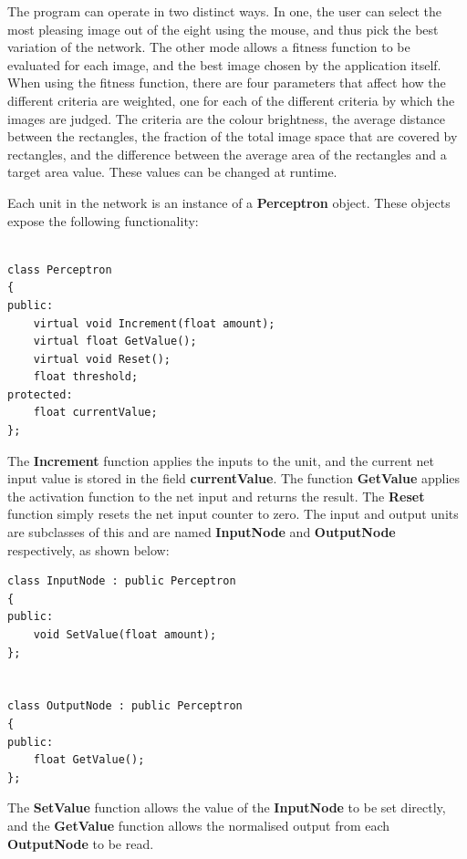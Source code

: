 \documentclass{acm_proc_article-sp}
\begin{document}
\vspace{3mm}

The program can operate in two distinct ways. In one, the user can select the most pleasing image out of the eight using the mouse, and thus pick the best variation of the network. The other mode allows a fitness function to be evaluated for each image, and the best image chosen by the application itself. When using the fitness function, there are four parameters that affect how the different criteria are weighted, one for each of the different criteria by which the images are judged. The criteria are the colour brightness, the average distance between the rectangles, the fraction of the total image space that are covered by rectangles, and the difference between the average area of the rectangles and a target area value. These values can be changed at runtime.

\vspace{3.2mm}

Each unit in the network is an instance of a \textbf{Perceptron} object. These objects expose the following functionality:

\begin{verbatim}

class Perceptron
{
public:
    virtual void Increment(float amount);
    virtual float GetValue();
    virtual void Reset();
    float threshold;
protected:
    float currentValue;	
};
\end{verbatim}

The \textbf{Increment} function applies the inputs to the unit, and the current net input value is stored in the field \textbf{currentValue}. The function \textbf{GetValue} applies the activation function to the net input and returns the result. The \textbf{Reset} function simply resets the net input counter to zero. The input and output units are subclasses of this and are named \textbf{InputNode} and \textbf{OutputNode} respectively, as shown below:

\begin{verbatim}
class InputNode : public Perceptron
{
public:
    void SetValue(float amount);
};


class OutputNode : public Perceptron
{
public:
    float GetValue();
};
\end{verbatim}

The \textbf{SetValue} function allows the value of the \textbf{InputNode} to be set directly, and the \textbf{GetValue} function allows the normalised output from each \textbf{OutputNode} to be read.
\end{document}
